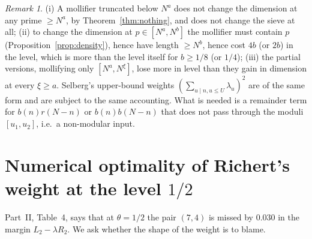 \documentclass[11pt]{amsart}
\theoremstyle{remark}
\newtheorem{remark}[theorem]{Remark}
\begin{document}
\begin{remark}
(i) A mollifier truncated below $N^a$ does not change the dimension at any prime $\ge N^a$, by Theorem~\ref{thm:nothing}, and does not change the sieve at all; (ii) to change the dimension at $p\in[N^a,N^b]$ the mollifier must contain $p$ (Proposition~\ref{prop:density}), hence have length $\ge N^b$, hence cost $4b$ (or $2b$) in the level, which is more than the level itself for $b\ge1/8$ (or $1/4$); (iii) the partial versions, mollifying only $[N^a,N^\xi]$, lose more in level than they gain in dimension at every $\xi\ge a$. Selberg's upper-bound weights $(\sum_{u\mid n,u\le U}\lambda_u)^2$ are of the same form and are subject to the same accounting. What is needed is a remainder term for $b(n)r(N-n)$ or $b(n)b(N-n)$ that does not pass through the moduli $[u_1,u_2]$, i.e.\ a non-modular input.
\end{remark}

\section{Numerical optimality of Richert's weight at the level $1/2$}\label{sec:optimal}

Part~II, Table~4, says that at $\theta=1/2$ the pair $(7,4)$ is missed by $0.030$ in the margin $L_2-\lambda R_2$. We ask whether the shape of the weight is to blame.
\end{document}

